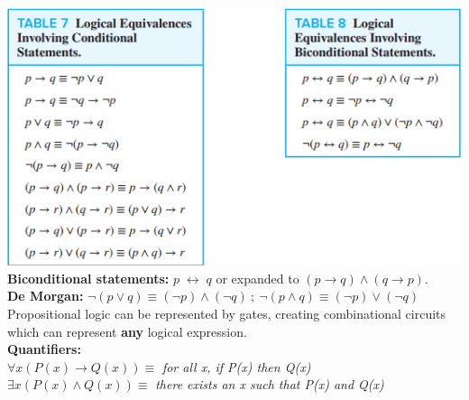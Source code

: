 \documentclass[12pt]{article}
\renewcommand{\iff}{\;\leftrightarrow\;}
\begin{document}
\includegraphics[scale=0.8]{logical_equivalences_conditional} \\
\smallskip
\textbf{Biconditional statements:} $ p \iff q$ or expanded to $(p \rightarrow q) \wedge (q \rightarrow p)$. \\
\smallskip{}
\textbf{De Morgan:} $\neg(p \vee q) \equiv (\neg p) \wedge (\neg q)\ ;\ \neg(p \wedge q) \equiv (\neg p ) \vee (\neg q) $
\smallskip
Propositional logic can be represented by gates, creating combinational circuits which can represent \textbf{any} logical expression. \\
\medskip
\textbf{Quantifiers:} \\
$
\forall x(P(x) \rightarrow Q(x)) \equiv
$
\textit{for all x, if P(x) then Q(x)} \\
$
\exists x(P(x) \wedge Q(x)) \equiv
$
\textit{there exists an x such that P(x) and Q(x)} \\
\end{document}
